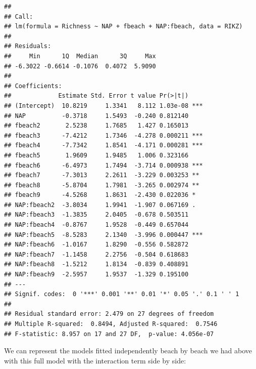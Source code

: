 \documentclass[
]{book}
\begin{document}
\begin{verbatim}
## 
## Call:
## lm(formula = Richness ~ NAP + fbeach + NAP:fbeach, data = RIKZ)
## 
## Residuals:
##     Min      1Q  Median      3Q     Max 
## -6.3022 -0.6614 -0.1076  0.4072  5.9090 
## 
## Coefficients:
##             Estimate Std. Error t value Pr(>|t|)    
## (Intercept)  10.8219     1.3341   8.112 1.03e-08 ***
## NAP          -0.3718     1.5493  -0.240 0.812140    
## fbeach2       2.5238     1.7685   1.427 0.165013    
## fbeach3      -7.4212     1.7346  -4.278 0.000211 ***
## fbeach4      -7.7342     1.8541  -4.171 0.000281 ***
## fbeach5       1.9609     1.9485   1.006 0.323166    
## fbeach6      -6.4973     1.7494  -3.714 0.000938 ***
## fbeach7      -7.3013     2.2611  -3.229 0.003253 ** 
## fbeach8      -5.8704     1.7981  -3.265 0.002974 ** 
## fbeach9      -4.5268     1.8631  -2.430 0.022036 *  
## NAP:fbeach2  -3.8034     1.9941  -1.907 0.067169 .  
## NAP:fbeach3  -1.3835     2.0405  -0.678 0.503511    
## NAP:fbeach4  -0.8767     1.9528  -0.449 0.657044    
## NAP:fbeach5  -8.5283     2.1340  -3.996 0.000447 ***
## NAP:fbeach6  -1.0167     1.8290  -0.556 0.582872    
## NAP:fbeach7  -1.1458     2.2756  -0.504 0.618683    
## NAP:fbeach8  -1.5212     1.8134  -0.839 0.408891    
## NAP:fbeach9  -2.5957     1.9537  -1.329 0.195100    
## ---
## Signif. codes:  0 '***' 0.001 '**' 0.01 '*' 0.05 '.' 0.1 ' ' 1
## 
## Residual standard error: 2.479 on 27 degrees of freedom
## Multiple R-squared:  0.8494, Adjusted R-squared:  0.7546 
## F-statistic: 8.957 on 17 and 27 DF,  p-value: 4.056e-07
\end{verbatim}

We can represent the models fitted independently beach by beach we had above with this full model with the interaction term side by side:
\end{document}
